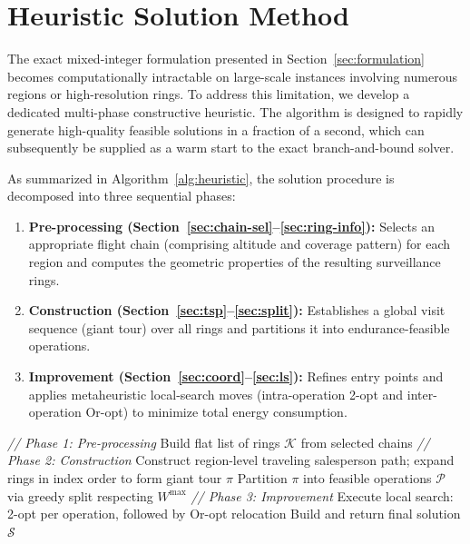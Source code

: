 \documentclass[12pt]{elsarticle}
\begin{document}


\section{Heuristic Solution Method}\label{sec:heuristic}

The exact mixed-integer formulation presented in Section~\ref{sec:formulation} becomes computationally intractable on large-scale instances involving numerous regions or high-resolution rings. To address this limitation, we develop a dedicated multi-phase constructive heuristic. The algorithm is designed to rapidly generate high-quality feasible solutions in a fraction of a second, which can subsequently be supplied as a warm start to the exact branch-and-bound solver. 

As summarized in Algorithm~\ref{alg:heuristic}, the solution procedure is decomposed into three sequential phases:
\begin{enumerate}
	\item \textbf{Pre-processing (Section~\ref{sec:chain-sel}--\ref{sec:ring-info}):} Selects an appropriate flight chain (comprising altitude and coverage pattern) for each region and computes the geometric properties of the resulting surveillance rings.
	\item \textbf{Construction (Section~\ref{sec:tsp}--\ref{sec:split}):} Establishes a global visit sequence (giant tour) over all rings and partitions it into endurance-feasible operations.
	\item \textbf{Improvement (Section~\ref{sec:coord}--\ref{sec:ls}):} Refines entry points and applies metaheuristic local-search moves (intra-operation 2-opt and inter-operation Or-opt) to minimize total energy consumption.
\end{enumerate}

\begin{algorithm}[t]
	\SetAlgoLined
	\BlankLine
	{\small \textit{// Phase 1: Pre-processing}}
	Build flat list of rings $\mathcal{K}$ from selected chains\;
	\BlankLine
	{\small \textit{// Phase 2: Construction}}
	Construct region-level traveling salesperson path; expand rings in index order to form giant tour $\pi$\;
	Partition $\pi$ into feasible operations $\mathcal{P}$ via greedy split respecting $W^{\max}$\;
	\BlankLine
	{\small \textit{// Phase 3: Improvement}}
	Execute local search: 2-opt per operation, followed by Or-opt relocation\;
	Build and return final solution $\mathcal{S}$\;
	\caption{Multi-phase heuristic framework for the drone coverage path planning problem.}
	\label{alg:heuristic}
\end{algorithm}
\end{document}

